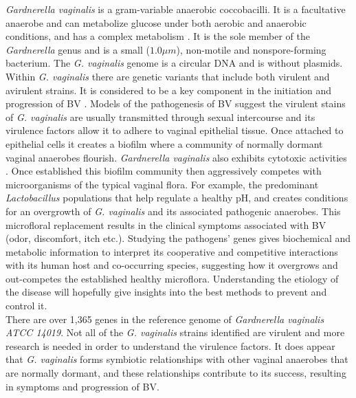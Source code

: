 \indent\textit{Gardnerella vaginalis} is a gram-variable anaerobic coccobacilli. It is a facultative anaerobe and can metabolize glucose under both aerobic and anaerobic conditions, and has a complex metabolism \citep{patterson_analysis_2010}. It is the sole member of the \textit{Gardnerella} genus and is a small (\(1.0  \mu m\)), non-motile and nonspore-forming bacterium. The \textit{G. vaginalis} genome is a circular DNA and is without plasmids. Within \textit{G. vaginalis} there are genetic variants that include both virulent and avirulent strains. It is considered to be a key component in the initiation and progression of BV \citep{schwebke_role_2014}. Models of the pathogenesis of BV suggest the virulent stains of \textit{G. vaginalis} are usually transmitted through sexual intercourse and its virulence factors allow it to adhere to vaginal epithelial tissue.  Once attached to epithelial cells it creates a biofilm where a community of normally dormant vaginal anaerobes flourish. \textit{Gardnerella vaginalis} also exhibits cytotoxic activities \citep{patterson_analysis_2010}. Once established this biofilm community then aggressively competes with microorganisms of the typical vaginal flora. For example, the predominant \textit{Lactobacillus} populations that help regulate a healthy pH, and creates conditions for an overgrowth of \textit{G. vaginalis} and its associated pathogenic anaerobes. This microfloral replacement results in the clinical symptoms associated with BV (odor, discomfort, itch etc.). Studying the pathogens' genes gives biochemical and metabolic information to interpret its cooperative and competitive interactions with its human host and co-occurring species, suggesting how it overgrows and out-competes the established healthy microflora. Understanding the etiology of the disease will hopefully give insights into the best methods to prevent and control it.   \\
\indent There are over 1,365 genes in the reference genome of \textit{Gardnerella vaginalis ATCC 14019}. Not all of the \textit{G. vaginalis} strains identified are virulent and more research is needed in order to understand the virulence factors. It does appear that \textit{G. vaginalis} forms symbiotic relationships with other vaginal anaerobes that are normally dormant, and these relationships contribute to its success, resulting in symptoms and progression of BV\citep{gardner_pathogenicity_1983,schwebke_role_2014}.